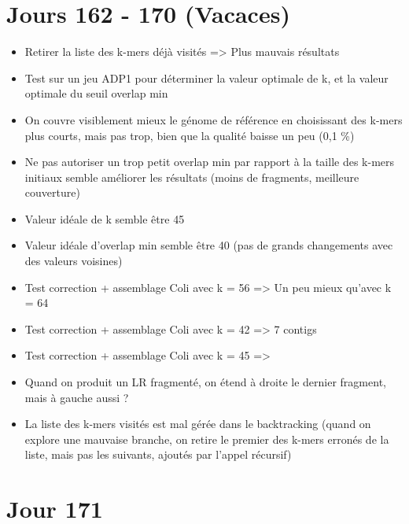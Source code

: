 \documentclass[12pt]{report}
\begin{document}
\section{Jours 162 - 170 (Vacaces)}

\begin{itemize}
	\item Retirer la liste des k-mers déjà visités => Plus mauvais résultats
	
	\item Test sur un jeu ADP1 pour déterminer la valeur optimale de k, et la valeur optimale du seuil overlap min
	
	\item On couvre visiblement mieux le génome de référence en choisissant des k-mers plus courts, mais pas trop, bien que la qualité
		  baisse un peu (0,1 \%)
	
	\item Ne pas autoriser un trop petit overlap min par rapport à la taille des k-mers initiaux semble améliorer les résultats
		  (moins de fragments, meilleure couverture)
	
	\item Valeur idéale de k semble être 45
	
	\item Valeur idéale d'overlap min semble être 40 (pas de grands changements avec des valeurs voisines)
	
	\item Test correction + assemblage Coli avec k = 56 => Un peu mieux qu'avec k = 64
	
	\item Test correction + assemblage Coli avec k = 42 => 7 contigs
	
	\item Test correction + assemblage Coli avec k = 45 =>
	
	\item Quand on produit un LR fragmenté, on étend à droite le dernier fragment, mais à gauche aussi ?
	
	\item La liste des k-mers visités est mal gérée dans le backtracking (quand on explore une mauvaise branche, on retire le premier des k-mers
		  erronés de la liste, mais pas les suivants, ajoutés par l'appel récursif)
\end{itemize}

\section{Jour 171}
\end{document}
